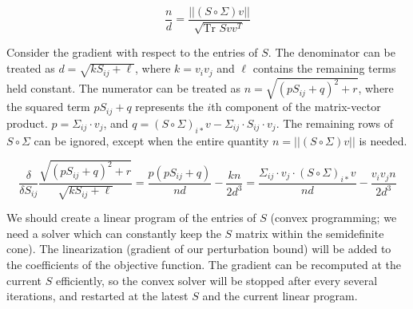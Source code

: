 \documentclass{article}
\begin{document}
$$
\frac{n}{d} = \frac{|| (S \circ \Sigma) v||}{\sqrt{\text{Tr }Svv^T}}
$$

Consider the gradient with respect to the entries of $S$. The denominator can be treated as $d = \sqrt{k S_{ij} + \ell}$, where $k = v_iv_j$ and $\ell$ contains the remaining terms held constant. The numerator can be treated as $n = \sqrt{(pS_{ij} + q)^2 + r}$, where the squared term $pS_{ij} + q$ represents the $i$th component of the matrix-vector product. $p = \Sigma_{ij} \cdot v_j$, and $q = (S \circ \Sigma)_{i*} v - \Sigma_{ij} \cdot S_{ij} \cdot v_j$. The remaining rows of $S \circ \Sigma$ can be ignored, except when the entire quantity $n = ||(S \circ \Sigma)v||$ is needed.

$$
\frac{\delta}{\delta S_{ij}}
\frac{\sqrt{(pS_{ij} + q)^2 + r}}{\sqrt{kS_{ij}+\ell}}
=
\frac{p(pS_{ij}+q)}{nd}
-
\frac{kn}{2d^3}
=
\frac{\Sigma_{ij} \cdot v_j \cdot (S \circ \Sigma)_{i*} v}{nd} - \frac{v_i v_j n}{2d^3}
$$

We should create a linear program of the entries of $S$ (convex programming; we need a solver which can constantly keep the $S$ matrix within the semidefinite cone). The linearization (gradient of our perturbation bound) will be added to the coefficients of the objective function. The gradient can be recomputed at the current $S$ efficiently, so the convex solver will be stopped after every several iterations, and restarted at the latest $S$ and the current linear program.
\end{document}
